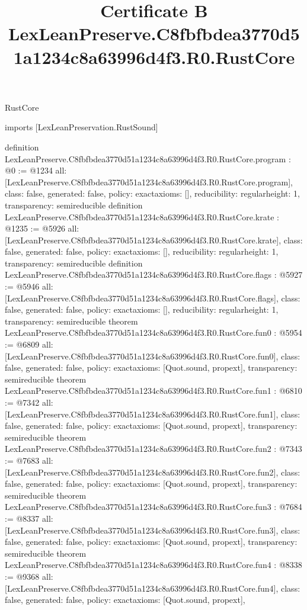 \begin{lexlean}{RustCore}
\title{Certificate B LexLeanPreserve.C8fbfbdea3770d51a1234c8a63996d4f3.R0.RustCore}
\begin{coremodule}
imports [LexLeanPreservation.RustSound]

definition LexLeanPreserve.C8fbfbdea3770d51a1234c8a63996d4f3.R0.RustCore.program : @0 := @1234 {
  all: [LexLeanPreserve.C8fbfbdea3770d51a1234c8a63996d4f3.R0.RustCore.program],
  class: false,
  generated: false,
  policy: exact{axioms: []},
  reducibility: regular{height: 1},
  transparency: semireducible
}
definition LexLeanPreserve.C8fbfbdea3770d51a1234c8a63996d4f3.R0.RustCore.krate : @1235 := @5926 {
  all: [LexLeanPreserve.C8fbfbdea3770d51a1234c8a63996d4f3.R0.RustCore.krate],
  class: false,
  generated: false,
  policy: exact{axioms: []},
  reducibility: regular{height: 1},
  transparency: semireducible
}
definition LexLeanPreserve.C8fbfbdea3770d51a1234c8a63996d4f3.R0.RustCore.flags : @5927 := @5946 {
  all: [LexLeanPreserve.C8fbfbdea3770d51a1234c8a63996d4f3.R0.RustCore.flags],
  class: false,
  generated: false,
  policy: exact{axioms: []},
  reducibility: regular{height: 1},
  transparency: semireducible
}
theorem LexLeanPreserve.C8fbfbdea3770d51a1234c8a63996d4f3.R0.RustCore.fun0 : @5954 := @6809 {
  all: [LexLeanPreserve.C8fbfbdea3770d51a1234c8a63996d4f3.R0.RustCore.fun0],
  class: false,
  generated: false,
  policy: exact{axioms: [Quot.sound, propext]},
  transparency: semireducible
}
theorem LexLeanPreserve.C8fbfbdea3770d51a1234c8a63996d4f3.R0.RustCore.fun1 : @6810 := @7342 {
  all: [LexLeanPreserve.C8fbfbdea3770d51a1234c8a63996d4f3.R0.RustCore.fun1],
  class: false,
  generated: false,
  policy: exact{axioms: [Quot.sound, propext]},
  transparency: semireducible
}
theorem LexLeanPreserve.C8fbfbdea3770d51a1234c8a63996d4f3.R0.RustCore.fun2 : @7343 := @7683 {
  all: [LexLeanPreserve.C8fbfbdea3770d51a1234c8a63996d4f3.R0.RustCore.fun2],
  class: false,
  generated: false,
  policy: exact{axioms: [Quot.sound, propext]},
  transparency: semireducible
}
theorem LexLeanPreserve.C8fbfbdea3770d51a1234c8a63996d4f3.R0.RustCore.fun3 : @7684 := @8337 {
  all: [LexLeanPreserve.C8fbfbdea3770d51a1234c8a63996d4f3.R0.RustCore.fun3],
  class: false,
  generated: false,
  policy: exact{axioms: [Quot.sound, propext]},
  transparency: semireducible
}
theorem LexLeanPreserve.C8fbfbdea3770d51a1234c8a63996d4f3.R0.RustCore.fun4 : @8338 := @9368 {
  all: [LexLeanPreserve.C8fbfbdea3770d51a1234c8a63996d4f3.R0.RustCore.fun4],
  class: false,
  generated: false,
  policy: exact{axioms: [Quot.sound, propext]},
}
\end{coremodule}
\end{lexlean}
